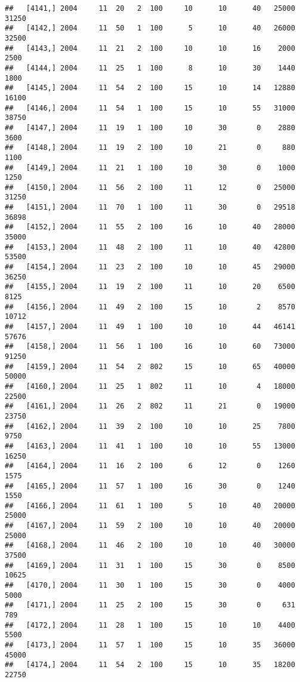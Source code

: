 \documentclass{article}\usepackage[]{graphicx}\usepackage[]{color}
\makeatletter
\newenvironment{kframe}{%
 \def\at@end@of@kframe{}%
 \ifinner\ifhmode%
  \def\at@end@of@kframe{\end{minipage}}%
  \begin{minipage}{\columnwidth}%
 \fi\fi%
 \def\FrameCommand##1{\hskip\@totalleftmargin \hskip-\fboxsep
 \colorbox{shadecolor}{##1}\hskip-\fboxsep
     \hskip-\linewidth \hskip-\@totalleftmargin \hskip\columnwidth}%
 \MakeFramed {\advance\hsize-\width
   \@totalleftmargin\z@ \linewidth\hsize
   \@setminipage}}%
 {\par\unskip\endMakeFramed%
 \at@end@of@kframe}
\newenvironment{knitrout}{}{} %
\makeatother
\begin{document}
\begin{knitrout}
\begin{kframe}
\begin{verbatim}
##   [4141,] 2004     11  20   2  100     10      10      40   25000   31250
##   [4142,] 2004     11  50   1  100      5      10      40   26000   32500
##   [4143,] 2004     11  21   2  100     10      10      16    2000    2500
##   [4144,] 2004     11  25   1  100      8      10      30    1440    1800
##   [4145,] 2004     11  54   2  100     15      10      14   12880   16100
##   [4146,] 2004     11  54   1  100     15      10      55   31000   38750
##   [4147,] 2004     11  19   1  100     10      30       0    2880    3600
##   [4148,] 2004     11  19   2  100     10      21       0     880    1100
##   [4149,] 2004     11  21   1  100     10      30       0    1000    1250
##   [4150,] 2004     11  56   2  100     11      12       0   25000   31250
##   [4151,] 2004     11  70   1  100     11      30       0   29518   36898
##   [4152,] 2004     11  55   2  100     16      10      40   28000   35000
##   [4153,] 2004     11  48   2  100     11      10      40   42800   53500
##   [4154,] 2004     11  23   2  100     10      10      45   29000   36250
##   [4155,] 2004     11  19   2  100     11      10      20    6500    8125
##   [4156,] 2004     11  49   2  100     15      10       2    8570   10712
##   [4157,] 2004     11  49   1  100     10      10      44   46141   57676
##   [4158,] 2004     11  56   1  100     16      10      60   73000   91250
##   [4159,] 2004     11  54   2  802     15      10      65   40000   50000
##   [4160,] 2004     11  25   1  802     11      10       4   18000   22500
##   [4161,] 2004     11  26   2  802     11      21       0   19000   23750
##   [4162,] 2004     11  39   2  100     10      10      25    7800    9750
##   [4163,] 2004     11  41   1  100     10      10      55   13000   16250
##   [4164,] 2004     11  16   2  100      6      12       0    1260    1575
##   [4165,] 2004     11  57   1  100     16      30       0    1240    1550
##   [4166,] 2004     11  61   1  100      5      10      40   20000   25000
##   [4167,] 2004     11  59   2  100     10      10      40   20000   25000
##   [4168,] 2004     11  46   2  100     10      10      40   30000   37500
##   [4169,] 2004     11  31   1  100     15      30       0    8500   10625
##   [4170,] 2004     11  30   1  100     15      30       0    4000    5000
##   [4171,] 2004     11  25   2  100     15      30       0     631     789
##   [4172,] 2004     11  28   1  100     15      10      10    4400    5500
##   [4173,] 2004     11  57   1  100     15      10      35   36000   45000
##   [4174,] 2004     11  54   2  100     15      10      35   18200   22750

\end{verbatim}
\end{kframe}
\end{knitrout}
\end{document}
